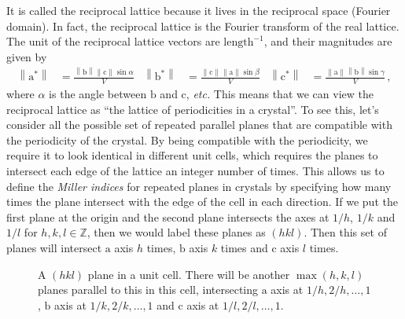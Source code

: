 \documentclass{article}
\theoremstyle{plain}\theoremheaderfont{\normalfont\itshape}\theorembodyfont{\rmfamily}\theoremseparator{.}\newtheorem*{rem}{Remark}\newtheorem*{ex}{Example}\newtheorem*{proof}{Proof}\newtheorem*{altp}{Alternative proof}
\theoremstyle{plain}\theoremheaderfont{\normalfont\bfseries}\theorembodyfont{\rmfamily}\theoremseparator{.}\newtheorem{thm}{Theorem}[section]\newtheorem{lem}[thm]{Lemma}\newtheorem{prop}[thm]{Proposition}\newtheorem*{cor}{Corollary}\newtheorem{defn}[thm]{Definition}\newtheorem{clm}[thm]{Claim}\newtheorem{clminproof}{Claim}\newtheorem*{law}{Law}\newtheorem{pos}[thm]{Postulate}
\theoremstyle{break}\theoremheaderfont{\normalfont\itshape}\theorembodyfont{\rmfamily}\theoremseparator{.\medskip}\newtheorem*{proofskip}{Proof}\newtheorem*{exs}{Examples}\newtheorem*{rems}{Remarks}
\theoremstyle{break}\theoremheaderfont{\normalfont\bfseries}\theorembodyfont{\rmfamily}\theoremseparator{.\medskip}\newtheorem{lemskip}[thm]{Lemma}\newtheorem{defnskip}[thm]{Definition}\newtheorem{propskip}[thm]{Proposition}\newtheorem{thmskip}[thm]{Theorem}
\numberwithin{equation}{section}
\newcommand{\vb}[1]{\bm{\mathrm{#1}}}
\newcommand{\norm}[1]{\left\| #1 \right\|}
\begin{document}
    It is called the reciprocal lattice because it lives in the reciprocal space (Fourier domain). In fact, the reciprocal lattice is the Fourier transform of the real lattice. The unit of the reciprocal lattice vectors are \(\text{length}^{-1}\), and their magnitudes are given by
    \begin{align}
        \norm{\vb{a}^*}&=\frac{\norm{\vb{b}}\norm{\vb{c}}\sin\alpha}{V} & \norm{\vb{b}^*}&=\frac{\norm{\vb{c}}\norm{\vb{a}}\sin\beta}{V} & \norm{\vb{c}^*}&=\frac{\norm{\vb{a}}\norm{\vb{b}}\sin\gamma}{V}\,,
    \end{align}
    where \(\alpha\) is the angle between \(\vb{b}\) and \(\vb{c}\), \textit{etc.} This means that we can view the reciprocal lattice as ``the lattice of periodicities in a crystal''. To see this, let's consider all the possible set of repeated parallel planes that are compatible with the periodicity of the crystal. By being compatible with the periodicity, we require it to look identical in different unit cells, which requires the planes to intersect each edge of the lattice an integer number of times. This allows us to define the \textit{Miller indices} for repeated planes in crystals by specifying how many times the plane intersect with the edge of the cell in each direction. If we put the first plane at the origin and the second plane intersects the axes at \(1/h\), \(1/k\) and \(1/l\) for \(h,k,l\in\mathbb{Z}\), then we would label these planes as \((hkl)\). Then this set of planes will intersect \(\vb{a}\) axis \(h\) times, \(\vb{b}\) axis \(k\) times and \(\vb{c}\) axis \(l\) times.

    \begin{figure}[ht!]
        \centering
        \caption{A \((hkl)\) plane in a unit cell. There will be another \(\max(h,k,l)\) planes parallel to this in this cell, intersecting \(\vb{a}\) axis at \(1/h,2/h,\dots,1\), \(\vb{b}\) axis at \(1/k,2/k,\dots,1\) and \(\vb{c}\) axis at \(1/l,2/l,\dots,1\).}
    \end{figure}
\end{document}
